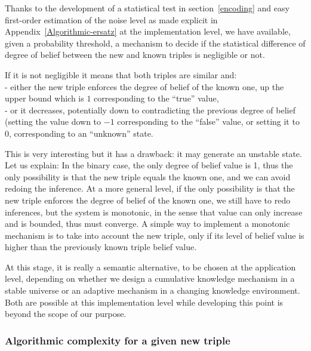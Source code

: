\documentclass[sn-mathphys]{sn-jnl}
\begin{document}
Thanks to the development of a statistical test in section~\ref{encoding} and easy first-order estimation of the noise level as made explicit in Appendix~\ref{Algorithmic-ersatz} at the implementation level, we have available, given a probability threshold, a mechanism to decide if the statistical difference of degree of belief between the new and known triples is negligible or not.

If it is not negligible it means that both triples are similar and:
\\- either the new triple enforces the degree of belief of the known one, up the upper bound which is $1$ corresponding to the ``true'' value,
\\- or it decreases, potentially down to contradicting the previous degree of belief (setting the value down to $-1$ corresponding to the ``false'' value, or setting it to $0$, corresponding to an ``unknown'' state.

This is very interesting but it has a drawback: it may generate an unstable state. Let us explain: In the binary case, the only  degree of belief value is 1, thus the only possibility is that the new triple equals the known one, and we can avoid redoing the inference. At a more general level, if the only possibility is that the new triple enforces the degree of belief of the known one, we still have to redo inferences, but the system is monotonic, in the sense that value can only increase and is bounded, thus must converge. A simple way to implement a monotonic mechanism is to take into account the new triple, only if its level of belief value is higher than the previously known triple belief value.

At this stage, it is really a semantic alternative, to be chosen at the application level, depending on whether we design a cumulative knowledge mechanism in a stable universe or an adaptive mechanism in a changing knowledge environment. Both are possible at this implementation level while developing this point is beyond the scope of our purpose.

\subsubsection{Algorithmic complexity for a given new triple}
\end{document}
